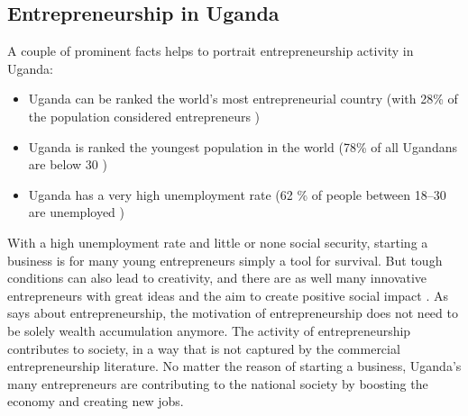 \subsection{Entrepreneurship in Uganda} %


    A couple of prominent facts helps to portrait entrepreneurship activity in Uganda:

    \begin{itemize}
      \item Uganda can be ranked the world's most entrepreneurial country (with 28\% of the population considered entrepreneurs \citep{goodis})
        \item Uganda is ranked the youngest population in the world (78\% of all Ugandans are below 30 \citep{unPopulation})
        \item Uganda has a very high unemployment rate (62 \% of people between 18–30 are unemployed \citep{lostopportunity})
    \end{itemize}


    With a high unemployment rate and little or none social security, starting a business is for many young entrepreneurs simply a tool for survival. But tough conditions can also lead to creativity, and there are as well many innovative entrepreneurs with great ideas and the aim to create positive social impact \citep{nissar}. As \cite{mitchel} says about entrepreneurship, the motivation of entrepreneurship does not need to be solely wealth accumulation anymore. The activity of entrepreneurship contributes to society, in a way that is not captured by the commercial entrepreneurship literature. No matter the reason of starting a business, Uganda's many entrepreneurs are contributing to the national society by boosting the economy and creating new jobs.

    

